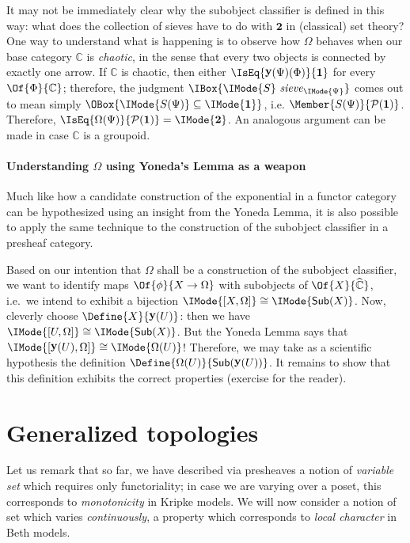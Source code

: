 \documentclass{article}
\DeclareMathOperator\OpYoneda{\mathbf{y}}
\newcommand\Yoneda[1]{\OpYoneda({#1})}
\newcommand\Psh[1]{\widehat{#1}}
\newcommand\IsSubsetEq[2]{\IMode{#1}\subseteq\IMode{#2}}
\newcommand\One{\mathbf{1}}
\newcommand\Two{\mathbf{2}}
\newcommand\IsSieve[2]{\IMode{#2}\ \mathit{sieve}_{\IMode{#1}}}
\newcommand\IsEquiv[2]{\IMode{#1}\cong\IMode{#2}}
\newcommand\Pow[1]{\mathcal{P} (#1)}
\newcommand\Sub[1]{\mathsf{Sub} (#1)}
\begin{document}
\begin{remark}
  It may not be immediately clear why the subobject classifier is
  defined in this way: what does the collection of sieves have to do
  with $\Two$ in (classical) set theory? One way to understand what is
  happening is to observe how $\Omega$ behaves when our base category
  $\mathbb{C}$ is \emph{chaotic}, in the sense that every two objects
  is connected by exactly one arrow.
%
  If $\mathbb{C}$ is chaotic, then either
  $\IsEq{\Yoneda{\Psi}(\Phi)}{\One}$ for every
  $\Of{\Phi}{\mathbb{C}}$; therefore, the judgment
  $\IBox{\IsSieve{\Psi}{S}}$ comes out to mean simply
  $\OBox{\IsSubsetEq{S(\Psi)}{\One}}$,
  i.e. $\Member{S(\Psi)}{\Pow{\One}}$. Therefore,
  $\IsEq{\Omega(\Psi)}{\Pow{\One}}=\IMode{\Two}$. An analogous
  argument can be made in case $\mathbb{C}$ is a groupoid.
\end{remark}

\paragraph{Understanding $\Omega$ using Yoneda's Lemma as a weapon}
Much like how a candidate construction of the exponential in a functor
category can be hypothesized using an insight from the Yoneda Lemma,
it is also possible to apply the same technique to the construction of
the subobject classifier in a presheaf category.

Based on our intention that $\Omega$ shall be a construction of the
subobject classifier, we want to identify maps $\Of{\phi}{X\to\Omega}$
with subobjects of $\Of{X}{\Psh{\mathbb{C}}}$, i.e.\ we intend to
exhibit a bijection $\IsEquiv{[X,\Omega]}{\Sub{X}}$.
%
Now, cleverly choose $\Define{X}{\Yoneda{U}}$: then we have
$\IsEquiv{[U,\Omega]}{\Sub{X}}$. But the Yoneda Lemma says that
$\IsEquiv{[\Yoneda{U},\Omega]}{\Omega(U)}$! Therefore, we may take as
a scientific hypothesis the definition
$\Define{\Omega(U)}{\Sub{\Yoneda{U}}}$. It remains to show that this
definition exhibits the correct properties (exercise for the reader).

\section{Generalized topologies}

Let us remark that so far, we have described via presheaves a notion
of \emph{variable set} which requires only functoriality; in case we
are varying over a poset, this corresponds to \emph{monotonicity} in
Kripke models. We will now consider a notion of set which varies
\emph{continuously}, a property which corresponds to \emph{local
  character} in Beth models.
\end{document}
